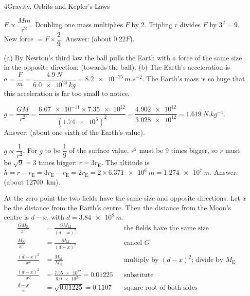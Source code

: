 \begin{chapteranswers}{4}{Gravity, Orbits and Kepler's Laws}
  \item $F \propto \dfrac{Mm}{r^2}$. Doubling one mass multiplies $F$ by 2. Tripling $r$ divides
        $F$ by $3^2 = 9$. New force $= F \times \dfrac{2}{9}$.
        Answer:  (about $0.22F$).
  \item (a) By Newton's third law the ball pulls the Earth with a force of the same size in the
        opposite direction:  (towards the ball).
        (b) The Earth's acceleration is
        $a = \dfrac{F}{m} = \dfrac{\qty{4.9}{N}}{\qty{6.0e24}{kg}} = \qty{8.2e-25}{m.s^{-2}}$.
        The Earth's mass is so huge that this acceleration is far too small to notice.
  \item $g = \dfrac{GM}{r^2} = \dfrac{\num{6.67e-11} \times \num{7.35e22}}{(\num{1.74e6})^2}
        = \dfrac{\num{4.902e12}}{\num{3.028e12}} = \qty{1.619}{N.kg^{-1}}$.
        Answer:  (about one sixth of the Earth's value).
  \item $g \propto \dfrac{1}{r^2}$. For $g$ to be $\dfrac19$ of the surface value, $r^2$ must be
        9 times bigger, so $r$ must be $\sqrt 9 = 3$ times bigger: $r = 3r_\mathrm{E}$.
        The altitude is $h = r - r_\mathrm{E} = 3r_\mathrm{E} - r_\mathrm{E} = 2r_\mathrm{E}
        = 2 \times \qty{6.371e6}{m} = \qty{1.274e7}{m}$.
        Answer:  (about \qty{12700}{km}).
  \item At the zero point the two fields have the same size and opposite directions. Let $x$ be
        the distance from the Earth's centre. Then the distance from the Moon's centre is $d - x$,
        with $d = \qty{3.84e8}{m}$.
        \begin{align*}
          \frac{GM_\mathrm{E}}{x^2} &= \frac{GM_\mathrm{M}}{(d-x)^2} && \text{the fields have the same size}\\
          \frac{M_\mathrm{E}}{x^2} &= \frac{M_\mathrm{M}}{(d-x)^2} && \text{cancel $G$}\\
          \frac{(d-x)^2}{x^2} &= \frac{M_\mathrm{M}}{M_\mathrm{E}} && \text{multiply by $(d-x)^2$; divide by $M_\mathrm{E}$}\\
          \frac{(d-x)^2}{x^2} &= \frac{\num{7.35e22}}{\num{6.0e24}} = 0.01225 && \text{substitute}\\
          \frac{d-x}{x} &= \sqrt{0.01225} = 0.1107 && \text{square root of both sides}\\

\end{align*}
\end{chapteranswers}

